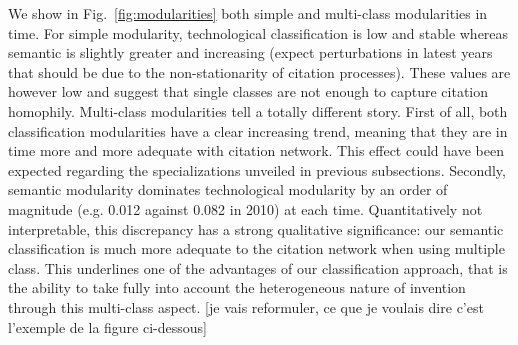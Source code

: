 \documentclass[10pt,A4]{article}
\begin{document}
We show in Fig.~\ref{fig:modularities} both simple and multi-class modularities in time. For simple modularity, technological classification is low and stable whereas semantic is slightly greater and increasing (expect perturbations in latest years that should be due to the non-stationarity of citation processes). These values are however low and suggest that single classes are not enough to capture citation homophily. Multi-class modularities tell a totally different story. First of all, both classification modularities have a clear increasing trend, meaning that they are in time more and more adequate with citation network. This effect could have been expected regarding the specializations unveiled in previous subsections. Secondly, semantic modularity dominates technological modularity by an order of magnitude (e.g. 0.012 against 0.082 in 2010) at each time. Quantitatively not interpretable, this discrepancy has a strong qualitative significance: our semantic classification is much more adequate to the citation network when using multiple class. This underlines one of the advantages of our classification approach, that is the ability to take fully into account the heterogeneous nature of invention through this multi-class aspect. [je vais reformuler, ce que je voulais dire c'est l'exemple de la figure ci-dessous]
\end{document}
